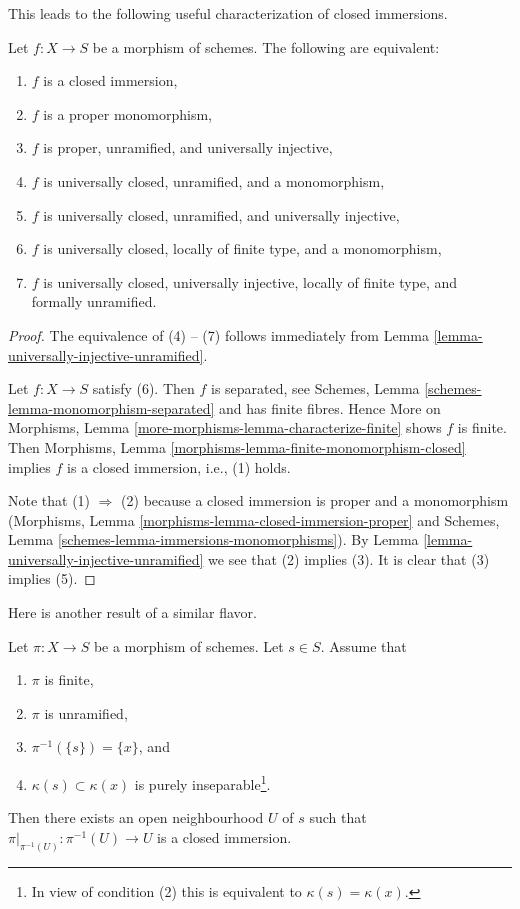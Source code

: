 \noindent
This leads to the following useful characterization of closed immersions.

\begin{lemma}
\label{lemma-characterize-closed-immersion}
Let $f : X \to S$ be a morphism of schemes.
The following are equivalent:
\begin{enumerate}
\item $f$ is a closed immersion,
\item $f$ is a proper monomorphism,
\item $f$ is proper, unramified, and universally injective,
\item $f$ is universally closed, unramified, and a monomorphism,
\item $f$ is universally closed, unramified, and universally injective,
\item $f$ is universally closed, locally of finite type, and a monomorphism,
\item $f$ is universally closed, universally injective, locally of
finite type, and formally unramified.
\end{enumerate}
\end{lemma}

\begin{proof}
The equivalence of (4) -- (7) follows immediately from
Lemma \ref{lemma-universally-injective-unramified}.

\medskip\noindent
Let $f : X \to S$ satisfy (6). Then $f$ is separated, see
Schemes, Lemma \ref{schemes-lemma-monomorphism-separated}
and has finite fibres. Hence
More on Morphisms, Lemma \ref{more-morphisms-lemma-characterize-finite}
shows $f$ is finite. Then
Morphisms, Lemma \ref{morphisms-lemma-finite-monomorphism-closed}
implies $f$ is a closed immersion, i.e., (1) holds.

\medskip\noindent
Note that (1) $\Rightarrow$ (2) because a closed immersion is
proper and a monomorphism
(Morphisms, Lemma \ref{morphisms-lemma-closed-immersion-proper}
and
Schemes, Lemma \ref{schemes-lemma-immersions-monomorphisms}).
By
Lemma \ref{lemma-universally-injective-unramified}
we see that (2) implies (3). It is clear that (3) implies (5).
\end{proof}

\noindent
Here is another result of a similar flavor.

\begin{lemma}
\label{lemma-finite-unramified-one-point}
Let $\pi : X \to S$ be a morphism of schemes. Let $s \in S$.
Assume that
\begin{enumerate}
\item $\pi$ is finite,
\item $\pi$ is unramified,
\item $\pi^{-1}(\{s\}) = \{x\}$, and
\item $\kappa(s) \subset \kappa(x)$ is purely
inseparable\footnote{In view of condition (2)
this is equivalent to $\kappa(s) = \kappa(x)$.}.
\end{enumerate}
Then there exists an open neighbourhood $U$ of $s$ such that
$\pi|_{\pi^{-1}(U)} : \pi^{-1}(U) \to U$ is a closed immersion.
\end{lemma}

